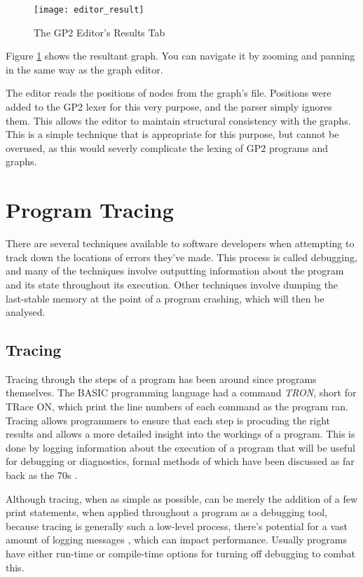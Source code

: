 \documentclass{UoYCSproject}
\begin{document}
\begin{figure}
\label{img:editor_result}
\texttt{[image: editor\_result]}
\caption{The GP2 Editor's Results Tab}
\end{figure}

Figure \ref{img:editor_result} shows the resultant graph. You can navigate it by zooming and panning in the same way as the graph editor.

The editor reads the positions of nodes from the graph's file. Positions were added to the GP2 lexer for this very purpose, and the parser simply ignores them. This allows the editor to maintain structural consistency with the graphs. This is a simple technique that is appropriate for this purpose, but cannot be overused, as this would severly complicate the lexing of GP2 programs and graphs.

\section{Program Tracing}
There are several techniques available to software developers when attempting to track down the locations of errors they've made. This process is called debugging, and many of the techniques involve outputting information about the program and its state throughout its execution. Other techniques involve dumping the last-stable memory at the point of a program crashing, which will then be analysed. 

\subsection{Tracing}
Tracing through the steps of a program has been around since programs themselves. The BASIC programming language had a command \emph{TRON}, short for TRace ON, which print the line numbers of each command as the program ran. 
Tracing allows programmers to ensure that each step is procuding the right results and allows a more detailed insight into the workings of a program. This is done by logging information about the execution of a program that will be useful for debugging or diagnostics, formal methods of which have been discussed as far back as the 70s \cite{psych_debug, code_walkthroughs}.

Although tracing, when as simple as possible, can be merely the addition of a few print statements, when applied throughout a program as a debugging tool, because tracing is generally such a low-level process, there's potential for a vast amount of logging messages \cite{tracing_book}, which can impact performance. Usually programs have either run-time or compile-time options for turning off debugging to combat this. %
\end{document}
